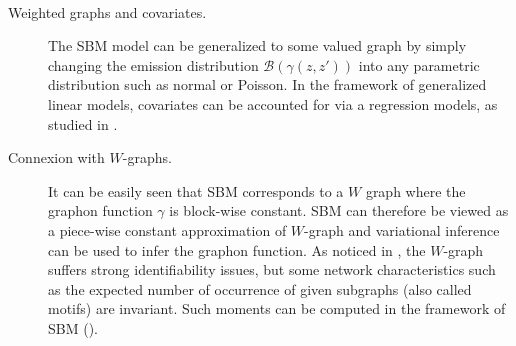 \documentclass[graybox]{svmult}
\renewcommand{\paragraph}[1]{~\\ \noindent {\bf #1}}
\begin{document}
\paragraph{Extension of SBM}

\begin{description}
  \item[Weighted graphs and covariates.]
  The SBM model can be generalized to some valued graph by simply changing the emission distribution $\mathcal B(\gamma(z, z'))$ into any parametric distribution such as normal or Poisson. In the framework of generalized linear models, covariates can be accounted for via a regression models, as studied in \cite{MRV10}.
  \item[Connexion with $W$-graphs.]
  It can be easily seen that SBM corresponds to a $W$ graph where the graphon function $\gamma$ is block-wise constant. SBM can therefore be viewed as a piece-wise constant approximation of $W$-graph and variational inference can be used to infer the graphon function. As noticed in \cite{ChD11}, the $W$-graph suffers strong identifiability issues, but some network characteristics such as the expected number of occurrence of given subgraphs (also called motifs) are invariant. Such moments can be computed in the framework of SBM (\cite{PDK08}).
\end{description}




\end{document}
